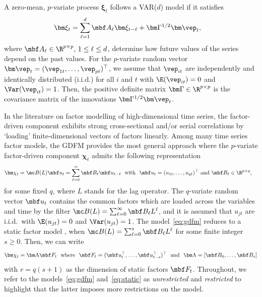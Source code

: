 A zero-mean, $p$-variate process $\bm\xi_t$ follows a VAR($d$) model if it satisfies
\begin{align}
\label{eq:idio:var}
    \bm\xi_t &= \sum_{\ell = 1}^{d} \mbf A_{\ell} \bm\xi_{t - \ell} + \bm\Gamma^{1/2} \bm\vep_t,
\end{align}
where $\mbf A_\ell \in \R^{p \times p}, \, 1 \le \ell \le d$, determine how future values of the series depend on the past values. 
For the $p$-variate random vector $\bm\vep_t = (\vep_{1t}, \ldots, \vep_{pt})^\top$, we assume that $\vep_{it}$ are independently and identically distributed (i.i.d.) for all $i$ and $t$ with $\E(\vep_{it}) = 0$ and $\Var(\vep_{it}) = 1$. Then, the positive definite matrix $\bm\Gamma \in \R^{p \times p}$ is the covariance matrix of the innovations $\bm\Gamma^{1/2} \bm\vep_t$.
 
In the literature on factor modelling of high-dimensional time series, the factor-driven component exhibits strong cross-sectional and/or serial correlations by `loading' finite-dimensional vectors of factors linearly.
Among many time series factor models, the GDFM \citep{forni2000generalized} provides the most general approach where the $p$-variate factor-driven component $\bm\chi_t$ admits the following representation
\begin{align}
    \bm\chi_t &= \mc B(L) \mbf u_t = \sum_{\ell = 0}^\infty \mbf B_\ell \mbf u_{t - \ell} \text{ \ with \ } \mbf u_t = (u_{1t}, \ldots, u_{qt})^\top \text{ and } \mbf B_\ell \in \R^{p \times q}, \label{eq:gdfm}
\end{align}
for some fixed $q$, where $L$ stands for the lag operator. 
The $q$-variate random vector $\mbf u_t$ contains the common factors which are loaded across the variables and time by the filter $\mc B(L) = \sum_{\ell = 0}^\infty \mbf B_\ell L^\ell$, and it is assumed that $u_{jt}$ are i.i.d.\ with $\E(u_{jt}) = 0$ and $\Var(u_{jt}) = 1$.
The model~\eqref{eq:gdfm} reduces to a static factor model \citep{bai2003, stock2002forecasting, fan2013large}, when $\mc B(L) = \sum_{\ell = 0}^s \mbf B_\ell L^\ell$ for some finite integer $s \ge 0$. Then, we can write 
\begin{align}
\label{eq:static}
    \bm\chi_t = \bm\Lambda \mbf F_t \text{ \ where \ } \mbf F_t = (\mbf u_t^\top, \ldots, \mbf u_{t - s}^\top)^\top \text{ \ and \ } \bm\Lambda = [\mbf B_0, \ldots, \mbf B_s]
\end{align}
with $r = q (s + 1)$ as the dimension of static factors $\mbf F_t$. 
Throughout, we refer to the models~\eqref{eq:gdfm} and~\eqref{eq:static} as {\it unrestricted} and {\it restricted} to highlight that the latter imposes more restrictions on the model.

